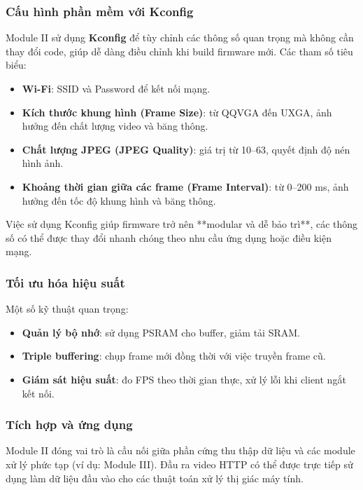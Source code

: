\subsubsection{Cấu hình phần mềm với Kconfig}
Module II sử dụng \textbf{Kconfig} để tùy chỉnh các thông số quan trọng mà không cần thay đổi code, giúp dễ dàng điều chỉnh khi build firmware mới. Các tham số tiêu biểu:

\begin{itemize}
    \item \textbf{Wi-Fi}: SSID và Password để kết nối mạng.
    \item \textbf{Kích thước khung hình (Frame Size)}: từ QQVGA đến UXGA, ảnh hưởng đến chất lượng video và băng thông.
    \item \textbf{Chất lượng JPEG (JPEG Quality)}: giá trị từ 10–63, quyết định độ nén hình ảnh.
    \item \textbf{Khoảng thời gian giữa các frame (Frame Interval)}: từ 0–200 ms, ảnh hưởng đến tốc độ khung hình và băng thông.
\end{itemize}

Việc sử dụng Kconfig giúp firmware trở nên **modular và dễ bảo trì**, các thông số có thể được thay đổi nhanh chóng theo nhu cầu ứng dụng hoặc điều kiện mạng.

\subsubsection{Tối ưu hóa hiệu suất}
Một số kỹ thuật quan trọng:

\begin{itemize}
    \item \textbf{Quản lý bộ nhớ}: sử dụng PSRAM cho buffer, giảm tải SRAM.
    \item \textbf{Triple buffering}: chụp frame mới đồng thời với việc truyền frame cũ.
    \item \textbf{Giám sát hiệu suất}: đo FPS theo thời gian thực, xử lý lỗi khi client ngắt kết nối.
\end{itemize}

\subsubsection{Tích hợp và ứng dụng}
Module II đóng vai trò là cầu nối giữa phần cứng thu thập dữ liệu và các module xử lý phức tạp (ví dụ: Module III). Đầu ra video HTTP có thể được trực tiếp sử dụng làm dữ liệu đầu vào cho các thuật toán xử lý thị giác máy tính.


